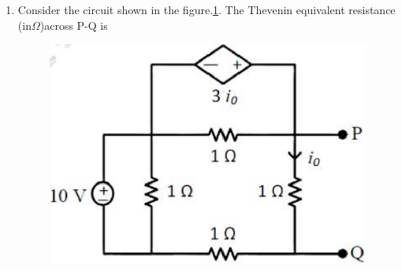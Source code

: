 \documentclass[journal,12pt,twocolumn]{IEEEtran}
\begin{document}
\begin{enumerate}
\item Consider the circuit shown in the figure.\ref{fig110}. The Thevenin equivalent resistance (in$ \Omega $)across P-Q is
\begin{figure}[!h]
\begin{center}
\includegraphics[scale=0.4]{./figs/fig110.eps}
\caption{}
\label{fig110}
\end{center}
\end{figure}

























































































\end{enumerate}
\end{document}
